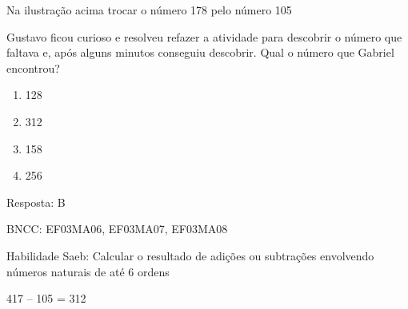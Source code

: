 Na ilustração acima trocar o número 178 pelo número 105

Gustavo ficou curioso e resolveu refazer a atividade para descobrir o
número que faltava e, após alguns minutos conseguiu descobrir. Qual o
número que Gabriel encontrou?

\begin{enumerate}
\def\labelenumi{\alph{enumi})}
\item
  128
\item
  312
\item
  158
\item
  256
\end{enumerate}

Resposta: B

BNCC: EF03MA06, EF03MA07, EF03MA08

Habilidade Saeb: Calcular o resultado de adições ou subtrações
envolvendo números naturais de até 6 ordens

417 -- 105 = 312
